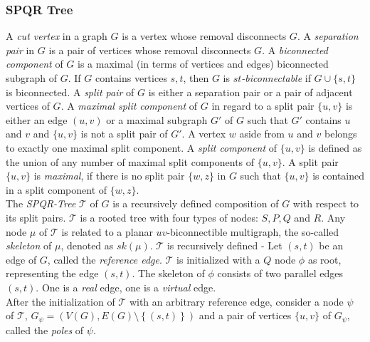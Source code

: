\subsubsection{SPQR Tree}
A \emph{cut vertex} in a graph $G$ is a vertex whose removal disconnects $G$. A \emph{separation pair} in $G$ is a pair of vertices whose removal disconnects $G$. A \emph{biconnected component} of $G$ is a maximal (in terms of vertices and edges) biconnected subgraph of $G$. If $G$ contains vertices $s,t$, then $G$ is \emph{$st$-biconnectable} if $G \cup \{s,t\}$ is biconnected. A \emph{split pair} of $G$ is either a separation pair or a pair of adjacent vertices of $G$. A \emph{maximal split component} of $G$ in regard to a split pair $\{u,v\}$ is either an edge $(u,v)$ or a maximal subgraph $G'$ of $G$ such that $G'$ contains $u$ and $v$ and $\{u,v\}$ is not a split pair of $G'$. A vertex $w$ aside from $u$ and $v$ belongs to exactly one maximal split component. A \emph{split component} of $\{u,v\}$ is defined as the union of any number of maximal split components of $\{u,v\}$. A split pair $\{u,v\}$ is \emph{maximal}, if there is no split pair $\{w,z\}$ in $G$ such that $\{u,v\}$ is contained in a split component of $\{w,z\}$.\\
The \emph{SPQR-Tree} $\mathcal{T}$ of $G$ is a recursively defined composition of $G$ with respect to its split pairs. $\mathcal{T}$ is a rooted tree with four types of nodes: $S,P,Q$ and $R$. Any node $\mu$ of $\mathcal{T}$ is related to a planar $uv$-biconnectible multigraph, the so-called \emph{skeleton} of $\mu$, denoted as $sk(\mu)$. $\mathcal{T}$ is recursively defined - Let $(s,t)$ be an edge of $G$, called the \emph{reference edge}. $\mathcal{T}$ is initialized with a $Q$ node $\phi$ as root, representing the edge $(s,t)$. The skeleton of $\phi$ consists of two parallel edges $(s,t)$. One is a \emph{real }edge, one is a \emph{virtual }edge.\\
After the initialization of $\mathcal{T}$ with an arbitrary reference edge, consider a node $\psi$ of $\mathcal{T}$, $G_\psi=\left(V(G),E(G)\setminus\left\{(s,t)\right\}\right)$ and a pair of vertices $\{u,v\}$ of $G_\psi$, called the \emph{poles} of $\psi$.


